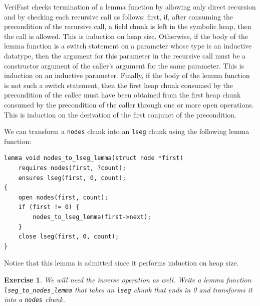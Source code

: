 \documentclass{article}
\newtheorem{exercise}{Exercise}
\begin{document}
VeriFast checks termination of a lemma function by allowing
only direct recursion and by checking each recursive call as
follows: first, if, after consuming the precondition of the
recursive call, a field chunk is left in the symbolic heap,
then the call is allowed. This is induction on heap size.
Otherwise, if the body of the lemma function is a switch
statement on a parameter whose type is an inductive datatype,
then the argument for this parameter in the recursive call must
be a constructor argument of the caller's argument for the same
parameter. This is induction on an inductive parameter.
Finally, if the body of the lemma function is not such a switch
statement, then the first heap chunk consumed by the
precondition of the callee must have been obtained from the
first heap chunk consumed by the precondition of the caller
through one or more open operations. This is induction on the
derivation of the first conjunct of the precondition.

We can transform a \lstinline!nodes! chunk into an
\lstinline!lseg! chunk using the following lemma function:
\begin{lstlisting}
lemma void nodes_to_lseg_lemma(struct node *first)
    requires nodes(first, ?count);
    ensures lseg(first, 0, count);
{
    open nodes(first, count);
    if (first != 0) {
        nodes_to_lseg_lemma(first->next);
    }
    close lseg(first, 0, count);
}
\end{lstlisting}
Notice that this lemma is admitted since it performs induction
on heap size.

\begin{exercise}\label{exercise:lemma}
We will need the inverse operation as well. Write a lemma
function \lstinline!lseg_to_nodes_lemma! that takes an
\lstinline!lseg! chunk that ends in 0 and transforms it into a
\lstinline!nodes! chunk.
\end{exercise}
\end{document}
